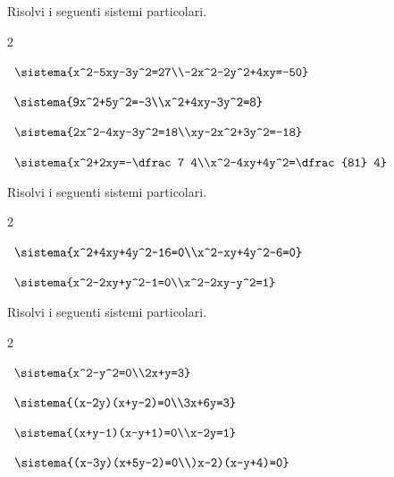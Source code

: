 \begin{esercizio}[*]
\label{ese:6.43}
Risolvi i seguenti sistemi particolari.
\begin{htmulticols}{2}
\begin{enumeratea}



\item~\(\sistema{x^2-5xy-3y^2=27\\-2x^2-2y^2+4xy=-50}\)

\item~\(\sistema{9x^2+5y^2=-3\\x^2+4xy-3y^2=8}\)



\item~\(\sistema{2x^2-4xy-3y^2=18\\xy-2x^2+3y^2=-18}\)
\item~\(\sistema{x^2+2xy=-\dfrac 7 
4\\x^2-4xy+4y^2=\dfrac{81} 
4}\)
\end{enumeratea}
\end{htmulticols}
\end{esercizio}

\begin{esercizio}[*]
\label{ese:6.44}
Risolvi i seguenti sistemi particolari.
\begin{htmulticols}{2}
\begin{enumeratea}



\item~\(\sistema{x^2+4xy+4y^2-16=0\\x^2-xy+4y^2-6=0}\)

\item~\(\sistema{x^2-2xy+y^2-1=0\\x^2-2xy-y^2=1}\)
\end{enumeratea}
\end{htmulticols}
\end{esercizio}

\begin{esercizio}
\label{ese:6.45}
Risolvi i seguenti sistemi particolari.
\begin{htmulticols}{2}
\begin{enumeratea}
\item~\(\sistema{x^2-y^2=0\\2x+y=3}\)

\item~\(\sistema{(x-2y)(x+y-2)=0\\3x+6y=3}\)

\item~\(\sistema{(x+y-1)(x-y+1)=0\\x-2y=1}\)

\item~\(\sistema{(x-3y)(x+5y-2)=0\\)x-2)(x-y+4)=0}\)
\end{enumeratea}
\end{htmulticols}
\end{esercizio}

